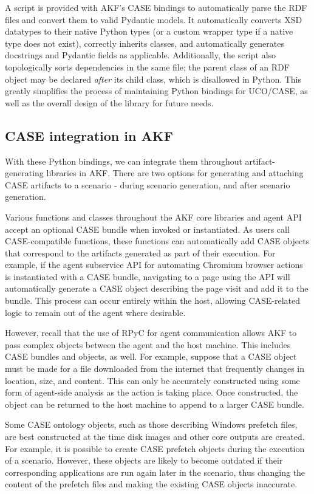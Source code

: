 A script is provided with AKF's CASE bindings to automatically parse the
RDF files and convert them to valid Pydantic models. It automatically
converts XSD datatypes to their native Python types (or a custom wrapper
type if a native type does not exist), correctly inherits classes, and
automatically generates docstrings and Pydantic fields as applicable.
Additionally, the script also topologically sorts dependencies in the
same file; the parent class of an RDF object may be declared
\emph{after} its child class, which is disallowed in Python. This
greatly simplifies the process of maintaining Python bindings for
UCO/CASE, as well as the overall design of the library for future needs.

\subsection{CASE integration in
AKF}\label{case-integration-in-akf}

With these Python bindings, we can integrate them throughout
artifact-generating libraries in AKF. There are two options for
generating and attaching CASE artifacts to a scenario - during scenario
generation, and after scenario generation.

Various functions and classes throughout the AKF core libraries and
agent API accept an optional CASE bundle when invoked or instantiated.
As users call CASE-compatible functions, these functions can
automatically add CASE objects that correspond to the artifacts
generated as part of their execution. For example, if the agent
subservice API for automating Chromium browser actions is instantiated
with a CASE bundle, navigating to a page using the API will
automatically generate a CASE object describing the page visit and add
it to the bundle. This process can occur entirely within the host,
allowing CASE-related logic to remain out of the agent where desirable.

However, recall that the use of RPyC for agent communication allows AKF
to pass complex objects between the agent and the host machine. This
includes CASE bundles and objects, as well. For example, suppose that a
CASE object must be made for a file downloaded from the internet that
frequently changes in location, size, and content. This can only be
accurately constructed using some form of agent-side analysis as the
action is taking place. Once constructed, the object can be returned to
the host machine to append to a larger CASE bundle.

Some CASE ontology objects, such as those describing Windows prefetch
files, are best constructed at the time disk images and other core
outputs are created. For example, it is possible to create CASE prefetch
objects during the execution of a scenario. However, these objects are
likely to become outdated if their corresponding applications are run
again later in the scenario, thus changing the content of the prefetch
files and making the existing CASE objects inaccurate.

